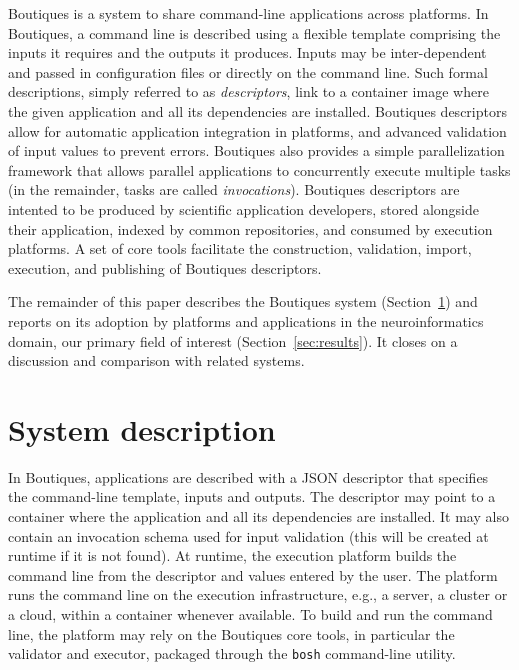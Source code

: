 \documentclass{article}
\newcommand{\note}[2]{\pdfmargincomment[color=yellow,author=#1,open=true]{#2}}
\newcommand{\boutiques}{Boutiques\xspace}
\begin{document}
\boutiques is a system to share command-line applications across
platforms. In \boutiques, a command line is described using a flexible
template comprising the inputs it requires and the outputs it
produces. Inputs may be inter-dependent and passed in configuration
files or directly on the command line. Such formal descriptions,
simply referred to as \emph{descriptors}, link to a container image
where the given application and all its dependencies are
installed. \boutiques descriptors allow for automatic application
integration in platforms, and advanced validation of input values to
prevent errors. \boutiques also provides a simple parallelization
framework that allows parallel applications to concurrently execute
multiple tasks (in the remainder, tasks are called
\emph{invocations}). \boutiques descriptors are intented to be
produced by scientific application developers, stored alongside their
application, indexed by common repositories, and consumed by
execution platforms.  A set of core tools facilitate the construction,
validation, import, execution, and publishing of \boutiques
descriptors.


The remainder of this paper describes the \boutiques system
(Section~\ref{sec:system}) and reports on its adoption by platforms
and applications in the neuroinformatics domain, our primary field of
interest (Section~\ref{sec:results}). It closes on a discussion and
comparison with related systems.


\section{System description}
\label{sec:system}

In \boutiques, applications are described with a JSON descriptor that
specifies the command-line template, inputs and outputs. The
descriptor may point to a container where the application and all its
dependencies are installed. It may also contain an invocation schema
used for input validation (this will be created at runtime if it is
not found). At runtime, the execution platform builds the command line
from the descriptor and values entered by the user. The platform runs
the command line on the execution infrastructure, e.g., a server, a
cluster or a cloud, within a container whenever available. To build
and run the command line, the platform may rely on the \boutiques core
tools, in particular the validator and executor, packaged through the
\texttt{bosh} command-line utility.
\end{document}
